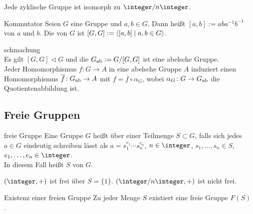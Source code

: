 \begin{Kor}
    Jede zyklische Gruppe ist isomorph zu $\integer/n\integer$.
\end{Kor}

\linie

\begin{Def}{Kommutator}
    Seien $G$ eine Gruppe und $a, b \in G$.
    Dann heißt $[a, b] := aba^{-1}b^{-1}$  von $a$ und $b$.
    Die  von $G$ ist
    $[G, G] := \left\langle{[a, b] \;|\; a, b \in G}\right\rangle$.
\end{Def}

\begin{Satz}{schmachung}\\
    Es gilt $[G, G] \vartriangleleft G$ und
    die  $G_{\text{ab}} := G/[G, G]$ ist eine
    abelsche Gruppe. \\
    Jeder Homomorphismus $f\colon G \rightarrow A$ in eine
    abelsche Gruppe $A$ induziert einen Homomorphismus
    $\overline{f}\colon G_{\text{ab}} \rightarrow A$ mit
    $f = \overline{f} \circ \alpha_G$, wobei
    $\alpha_G\colon G \rightarrow G_{\text{ab}}$ die Quotientenabbildung ist.
\end{Satz}

\subsection{%
    Freie Gruppen%
}

\begin{Def}{freie Gruppe}
    Eine Gruppe $G$ heißt  über einer Teilmenge $S \subset G$,
    falls sich jedes $a \in G$ eindeutig schreiben lässt als
    $a = s_1^{e_1} \dotsm s_n^{e_n}$, $n \in \integer$,
    $s_1, \dotsc, s_n \in S$, $e_1, \dotsc, e_n \in \integer$. \\
    In diesem Fall heißt $S$  von $G$.
\end{Def}

\begin{Bsp}
    $(\integer, +)$ ist frei über $S = \{1\}$.
    $(\integer/n\integer, +)$ ist nicht frei.
\end{Bsp}

\begin{Satz}{Existenz einer freien Gruppe}
    Zu jeder Menge $S$ existiert eine freie Gruppe $F(S)$.
\end{Satz}

